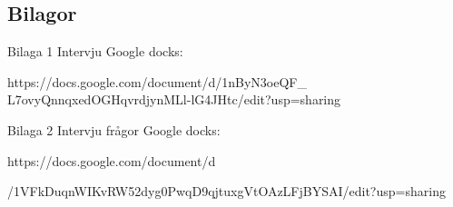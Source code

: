 \documentclass[11p]{article}
\begin{document}
\begin{otherlanguage}{swedish}
        \newpage
        \section{Bilagor}

        Bilaga 1
        Intervju
        Google docks:

        https://docs.google.com/document/d/1nByN3oeQF\_
        L7ovyQnnqxedOGHqvrdjynMLl-lG4JHtc/edit?usp=sharing

        Bilaga 2
        Intervju frågor
        Google docks:

        https://docs.google.com/document/d

        /1VFkDuqnWIKvRW52dyg0PwqD9qjtuxgVtOAzLFjBYSAI/edit?usp=sharing


    \end{otherlanguage}
\end{document}
